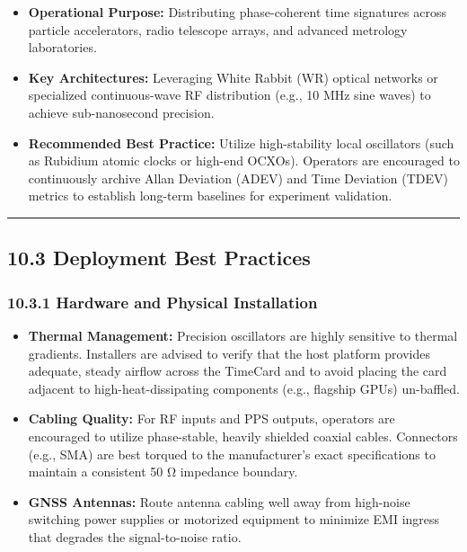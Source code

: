 \documentclass[
]{article}
\begin{document}
\begin{itemize}
\item
  \textbf{Operational Purpose:} Distributing phase-coherent time
  signatures across particle accelerators, radio telescope arrays, and
  advanced metrology laboratories.
\item
  \textbf{Key Architectures:} Leveraging White Rabbit (WR) optical
  networks or specialized continuous-wave RF distribution (e.g., 10 MHz
  sine waves) to achieve sub-nanosecond precision.
\item
  \textbf{Recommended Best Practice:} Utilize high-stability local
  oscillators (such as Rubidium atomic clocks or high-end OCXOs).
  Operators are encouraged to continuously archive Allan Deviation
  (ADEV) and Time Deviation (TDEV) metrics to establish long-term
  baselines for experiment validation.
\end{itemize}

\begin{center}\rule{0.5\linewidth}{0.5pt}\end{center}

\subsection{10.3 Deployment Best
Practices}\label{deployment-best-practices}

\subsubsection{10.3.1 Hardware and Physical
Installation}\label{hardware-and-physical-installation}

\begin{itemize}
\item
  \textbf{Thermal Management:} Precision oscillators are highly
  sensitive to thermal gradients. Installers are advised to verify that
  the host platform provides adequate, steady airflow across the
  TimeCard and to avoid placing the card adjacent to
  high-heat-dissipating components (e.g., flagship GPUs) un-baffled.
\item
  \textbf{Cabling Quality:} For RF inputs and PPS outputs, operators are
  encouraged to utilize phase-stable, heavily shielded coaxial cables.
  Connectors (e.g., SMA) are best torqued to the manufacturer's exact
  specifications to maintain a consistent 50 Ω impedance boundary.
\item
  \textbf{GNSS Antennas:} Route antenna cabling well away from
  high-noise switching power supplies or motorized equipment to minimize
  EMI ingress that degrades the signal-to-noise ratio.
\end{itemize}
\end{document}
